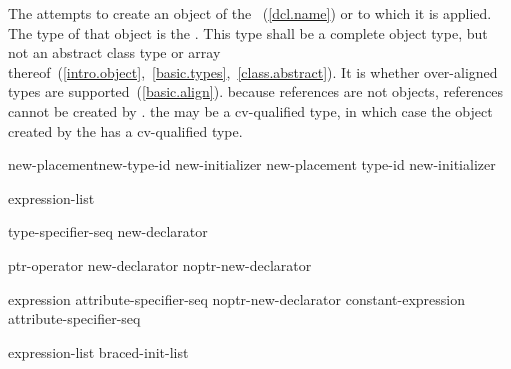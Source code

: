\pnum
{}%
%
%
%
%
The  attempts to create an object of the
~(\ref{dcl.name}) or  to which
it is applied. The type of that object is the .
%
This type shall be a complete object type, but not an abstract class
type or array
thereof~(\ref{intro.object},~\ref{basic.types},~\ref{class.abstract}).
It is  whether over-aligned types are
supported~(\ref{basic.align}).
\enternote 
because references are not objects, references cannot be created by
.
\exitnote 
\enternote 
the  may be a cv-qualified type, in which case the
object created by the  has a cv-qualified type.
\exitnote 

\begin{bnf}
\br
    \terminal{::}\opt {} new-placement\opt new-type-id new-initializer\opt \br
    \terminal{::}\opt {} new-placement\opt \terminal{(} type-id \terminal{)} new-initializer\opt
\end{bnf}

%
%
\begin{bnf}
\br
    \terminal{(} expression-list \terminal{)}
\end{bnf}

\begin{bnf}
\br
    type-specifier-seq new-declarator\opt
\end{bnf}

\begin{bnf}
\br
    ptr-operator new-declarator\opt \br
    noptr-new-declarator
\end{bnf}

\begin{bnf}
\br
    \terminal{[} expression \terminal{]} attribute-specifier-seq\opt\br
    noptr-new-declarator \terminal{[} constant-expression \terminal{]} attribute-specifier-seq\opt
\end{bnf}

\begin{bnf}
\br
    \terminal{(} expression-list\opt \terminal{)}\br
    braced-init-list
\end{bnf}

